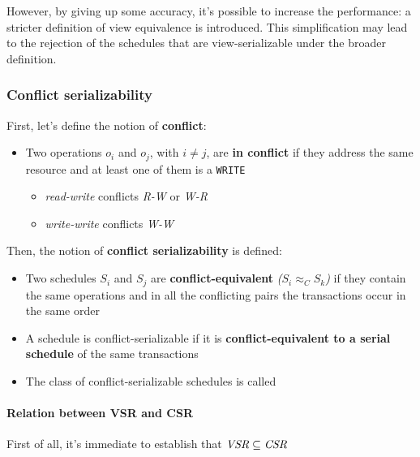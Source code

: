 \documentclass[english]{article}
\begin{document}
However, by giving up some accuracy, it's possible to increase the performance: a stricter definition of view equivalence is introduced.
This simplification may lead to the rejection of the schedules that are view-serializable under the broader definition.

\subsubsection{Conflict serializability}

First, let's define the notion of \textbf{conflict}:

\begin{itemize}
  \item Two operations \(o_i\) and \(o_j\), with \(i \neq j\), are \textbf{in conflict} if they address the same resource and at least one of them is a \texttt{WRITE}
        \begin{itemize}
          \item \textit{read-write} conflicts \textit{R-W} or \textit{W-R}
          \item \textit{write-write} conflicts \textit{W-W}
        \end{itemize}
\end{itemize}

Then, the notion of \textbf{conflict serializability} is defined:

\begin{itemize}
  \item Two schedules \(S_i\) and \(S_j\) are \textbf{conflict-equivalent} \textit{(\(S_i \approx_C S_k\))} if they contain the same operations and in all the conflicting pairs the transactions occur in the same order
  \item A schedule is conflict-serializable if it is \textbf{conflict-equivalent to a serial schedule} of the same transactions
  \item The class of conflict-serializable schedules is called \CSR
\end{itemize}

\paragraph{Relation between VSR and CSR}

First of all, it's immediate to establish that \(\textit{VSR} \subseteq \textit{CSR}\)
\end{document}

